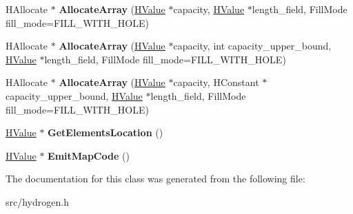 \begin{DoxyCompactItemize}
\item 
\hypertarget{classv8_1_1internal_1_1_h_graph_builder_1_1_v8___f_i_n_a_l_aca80d84022266b865a29700ea67e11cd}{}H\+Allocate $\ast$ {\bfseries Allocate\+Array} (\hyperlink{classv8_1_1internal_1_1_h_value}{H\+Value} $\ast$capacity, \hyperlink{classv8_1_1internal_1_1_h_value}{H\+Value} $\ast$length\+\_\+field, Fill\+Mode fill\+\_\+mode=F\+I\+L\+L\+\_\+\+W\+I\+T\+H\+\_\+\+H\+O\+L\+E)\label{classv8_1_1internal_1_1_h_graph_builder_1_1_v8___f_i_n_a_l_aca80d84022266b865a29700ea67e11cd}

\item 
\hypertarget{classv8_1_1internal_1_1_h_graph_builder_1_1_v8___f_i_n_a_l_a087dae5b693afaac9a024985b6427f15}{}H\+Allocate $\ast$ {\bfseries Allocate\+Array} (\hyperlink{classv8_1_1internal_1_1_h_value}{H\+Value} $\ast$capacity, int capacity\+\_\+upper\+\_\+bound, \hyperlink{classv8_1_1internal_1_1_h_value}{H\+Value} $\ast$length\+\_\+field, Fill\+Mode fill\+\_\+mode=F\+I\+L\+L\+\_\+\+W\+I\+T\+H\+\_\+\+H\+O\+L\+E)\label{classv8_1_1internal_1_1_h_graph_builder_1_1_v8___f_i_n_a_l_a087dae5b693afaac9a024985b6427f15}

\item 
\hypertarget{classv8_1_1internal_1_1_h_graph_builder_1_1_v8___f_i_n_a_l_a0ee0649bfdf219c3db92fabd9cbf7952}{}H\+Allocate $\ast$ {\bfseries Allocate\+Array} (\hyperlink{classv8_1_1internal_1_1_h_value}{H\+Value} $\ast$capacity, H\+Constant $\ast$capacity\+\_\+upper\+\_\+bound, \hyperlink{classv8_1_1internal_1_1_h_value}{H\+Value} $\ast$length\+\_\+field, Fill\+Mode fill\+\_\+mode=F\+I\+L\+L\+\_\+\+W\+I\+T\+H\+\_\+\+H\+O\+L\+E)\label{classv8_1_1internal_1_1_h_graph_builder_1_1_v8___f_i_n_a_l_a0ee0649bfdf219c3db92fabd9cbf7952}

\item 
\hypertarget{classv8_1_1internal_1_1_h_graph_builder_1_1_v8___f_i_n_a_l_a831bb958b7f3c3790f000b3068e3c573}{}\hyperlink{classv8_1_1internal_1_1_h_value}{H\+Value} $\ast$ {\bfseries Get\+Elements\+Location} ()\label{classv8_1_1internal_1_1_h_graph_builder_1_1_v8___f_i_n_a_l_a831bb958b7f3c3790f000b3068e3c573}

\item 
\hypertarget{classv8_1_1internal_1_1_h_graph_builder_1_1_v8___f_i_n_a_l_aaa1c2f7761dd0cecb80077bc49afd874}{}\hyperlink{classv8_1_1internal_1_1_h_value}{H\+Value} $\ast$ {\bfseries Emit\+Map\+Code} ()\label{classv8_1_1internal_1_1_h_graph_builder_1_1_v8___f_i_n_a_l_aaa1c2f7761dd0cecb80077bc49afd874}

\end{DoxyCompactItemize}


The documentation for this class was generated from the following file\+:\begin{DoxyCompactItemize}
\item 
src/hydrogen.\+h\end{DoxyCompactItemize}
